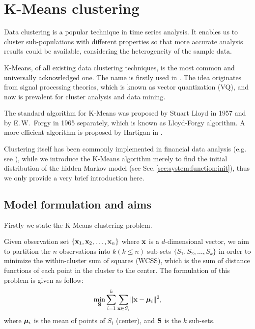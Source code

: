 
\section{K-Means clustering}
\label{sec:preliminary:kmeans}
Data clustering is a popular technique in time series analysis.
It enables us to cluster sub-populations with different properties so that 
more accurate analysis results could be available,
considering the heterogeneity of the sample data.

K-Means, of all existing data clustering techniques,
is the most common and universally acknowledged one.
The name is firstly used in \cite{Macqueen:1967uv}.
The idea originates from signal processing theories, 
which is known as vector quantization (VQ),
and now is prevalent for cluster analysis and data mining.

The standard algorithm for K-Means was proposed by Stuart Lloyd in 1957 and 
by E.\,W.~Forgy in 1965 \cite{Forgy:1965cl} separately, 
which is known as Lloyd-Forgy algorithm.
A more efficient algorithm is proposed by Hartigan in \cite{Hartigan:1975cl}.

Clustering itself has been commonly implemented in financial data analysis
(e.g.\,see \cite{Cont:2001gv,Babu:2012wl,Gupta:2014tp}),
while we introduce the K-Means algorithm merely to find the initial distribution 
of the hidden Markov model (see Sec.\,\ref{sec:system:function:init}),
thus we only provide a very brief introduction here.


\subsection{Model formulation and aims}
\label{sec:preliminary:kmeans:formulation}
Firstly we state the K-Means clustering problem.

Given observation set $\{{\mathbf x}_1,{\mathbf x}_2,\dots,{\mathbf x}_n\}$ where ${\mathbf x}$ is a $d$-dimensional vector,
we aim to partition the $n$ observations into $k (k\leq n)$ sub-sets $\{S_1,S_2,\dots,S_k\}$
in order to minimize the within-cluster sum of squares (WCSS), 
which is the sum of distance functions of each point in the cluster to the center.
The formulation of this problem is given as follow:
		\begin{equation}
		\label{eq:preliminary:kmeans}
		\min_{{\mathbf S}} \sum_{i=1}^{k}\sum_{{\mathbf x} \in S_i} \lVert{\mathbf x} - {\boldsymbol\mu}_i\rVert^2,
		\end{equation}
where ${\boldsymbol\mu}_i$ is the mean of points of $S_i$ (center),
and ${\mathbf S}$ is the $k$ sub-sets.

